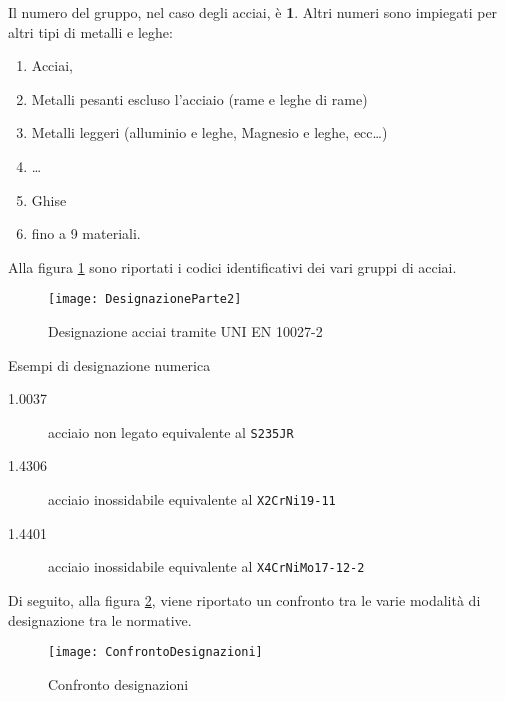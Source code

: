 Il numero del gruppo, nel caso degli acciai, è \textbf{1}. Altri numeri sono impiegati per altri tipi di metalli e leghe:

\begin{enumerate}
\item Acciai,
\item Metalli pesanti escluso l'acciaio (rame e leghe di rame)
\item Metalli leggeri (alluminio e leghe, Magnesio e leghe, ecc\dots)
\item \dots
\item Ghise
\item fino a 9 materiali.
\end{enumerate}

Alla figura \ref{fig:UNIEN10027-2} sono riportati i codici identificativi dei vari gruppi di acciai.

\begin{figure}
\centering
\texttt{[image: DesignazioneParte2]}
\caption{Designazione acciai tramite UNI EN 10027-2}
\label{fig:UNIEN10027-2}
\end{figure}

\begin{example}{Esempi di designazione numerica}
\begin{description}
\item[1.0037] acciaio non legato equivalente al \texttt{S235JR}
\item[1.4306] acciaio inossidabile equivalente al \texttt{X2CrNi19-11}
\item[1.4401] acciaio inossidabile equivalente al \texttt{X4CrNiMo17-12-2}
\end{description}
\end{example}

Di seguito, alla figura \ref{fig:ConfDes}, viene riportato un confronto tra le varie modalità di designazione tra le normative.

\begin{figure}
\centering
\texttt{[image: ConfrontoDesignazioni]}
\caption{Confronto designazioni}\label{fig:ConfDes}
\end{figure}

